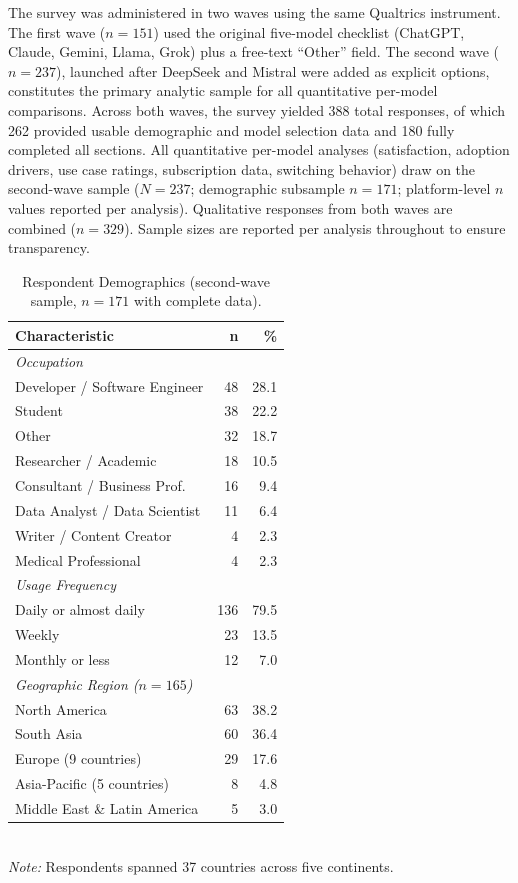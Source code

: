 \documentclass[10pt,twocolumn]{article}
\begin{document}
The survey was administered in two waves using the same Qualtrics instrument. The first wave ($n=151$) used the original five-model checklist (ChatGPT, Claude, Gemini, Llama, Grok) plus a free-text ``Other'' field. The second wave ($n=237$), launched after DeepSeek and Mistral were added as explicit options, constitutes the primary analytic sample for all quantitative per-model comparisons. Across both waves, the survey yielded 388 total responses, of which 262 provided usable demographic and model selection data and 180 fully completed all sections. All quantitative per-model analyses (satisfaction, adoption drivers, use case ratings, subscription data, switching behavior) draw on the second-wave sample ($N=237$; demographic subsample $n=171$; platform-level $n$ values reported per analysis). Qualitative responses from both waves are combined ($n=329$). Sample sizes are reported per analysis throughout to ensure transparency.

\begin{table}[t]
\centering
\caption{Respondent Demographics (second-wave sample, $n=171$ with complete data).}
\label{tab:demographics}
\small
\begin{tabular}{lrr}
\toprule
\textbf{Characteristic} & \textbf{n} & \textbf{\%} \\
\midrule
\textit{Occupation} & & \\
\quad Developer / Software Engineer & 48 & 28.1 \\
\quad Student & 38 & 22.2 \\
\quad Other & 32 & 18.7 \\
\quad Researcher / Academic & 18 & 10.5 \\
\quad Consultant / Business Prof. & 16 & 9.4 \\
\quad Data Analyst / Data Scientist & 11 & 6.4 \\
\quad Writer / Content Creator & 4 & 2.3 \\
\quad Medical Professional & 4 & 2.3 \\
\midrule
\textit{Usage Frequency} & & \\
\quad Daily or almost daily & 136 & 79.5 \\
\quad Weekly & 23 & 13.5 \\
\quad Monthly or less & 12 & 7.0 \\
\midrule
\textit{Geographic Region ($n=165$)} & & \\
\quad North America & 63 & 38.2 \\
\quad South Asia & 60 & 36.4 \\
\quad Europe (9 countries) & 29 & 17.6 \\
\quad Asia-Pacific (5 countries) & 8 & 4.8 \\
\quad Middle East \& Latin America & 5 & 3.0 \\
\bottomrule
\end{tabular}
\vspace{2pt}
\\\footnotesize\textit{Note:} Respondents spanned 37 countries across five continents.
\end{table}
\end{document}

